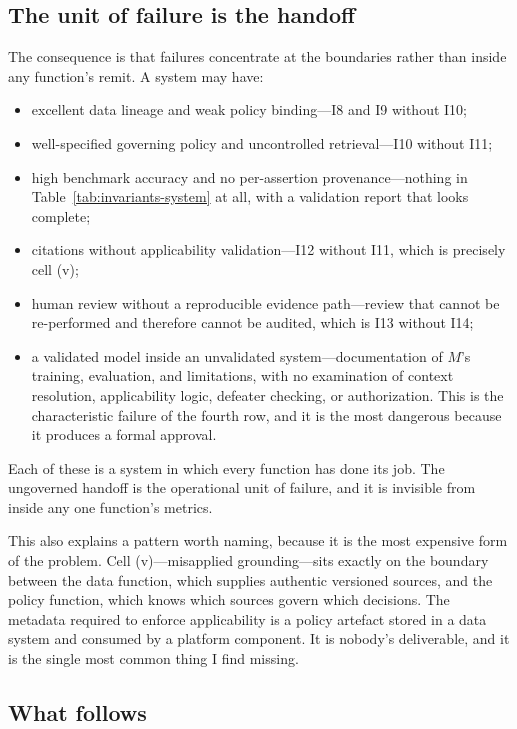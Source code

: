 \documentclass[11pt]{article}
\theoremstyle{plain}
\theoremstyle{definition}
\begin{document}
\subsection{The unit of failure is the handoff}

The consequence is that failures concentrate at the boundaries rather than inside
any function's remit. A system may have:

\begin{itemize}
  \item excellent data lineage and weak policy binding---I8 and I9 without I10;
  \item well-specified governing policy and uncontrolled retrieval---I10 without
        I11;
  \item high benchmark accuracy and no per-assertion provenance---nothing in
        Table~\ref{tab:invariants-system} at all, with a validation report that
        looks complete;
  \item citations without applicability validation---I12 without I11, which is
        precisely cell (v);
  \item human review without a reproducible evidence path---review that cannot be
        re-performed and therefore cannot be audited, which is I13 without I14;
  \item a validated model inside an unvalidated system---documentation of $M$'s
        training, evaluation, and limitations, with no examination of context
        resolution, applicability logic, defeater checking, or authorization. This is
        the characteristic failure of the fourth row, and it is the most dangerous
        because it produces a formal approval.
\end{itemize}

Each of these is a system in which every function has done its job. The ungoverned
handoff is the operational unit of failure, and it is invisible from inside any one
function's metrics.

This also explains a pattern worth naming, because it is the most expensive form of
the problem. Cell (v)---misapplied grounding---sits exactly on the boundary between
the data function, which supplies authentic versioned sources, and the policy
function, which knows which sources govern which decisions. The metadata required to
enforce applicability is a policy artefact stored in a data system and consumed by a
platform component. It is nobody's deliverable, and it is the single most common
thing I find missing.

\subsection{What follows}
\end{document}
